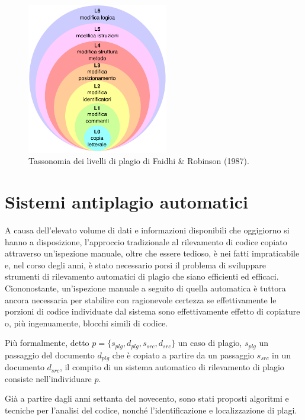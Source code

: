 \begin{figure}[h]
    \centering
    \includegraphics[width=0.55\textwidth]{resources/img/01-levels-of-plagiarism.pdf}
    \caption{Tassonomia dei livelli di plagio di Faidhi \& Robinson (1987).}
    \label{img:01-levels-of-plagiarism}
\end{figure}

\section{Sistemi antiplagio automatici}
A causa dell'elevato volume di dati e informazioni disponibili che oggigiorno si hanno a disposizione, l'approccio tradizionale al rilevamento di codice copiato attraverso un'ispezione manuale, oltre che essere tedioso, è nei fatti impraticabile e, nel corso degli anni, è stato necessario porsi il problema di sviluppare strumenti di rilevamento automatici di plagio che siano efficienti ed efficaci.
%
Ciononostante, un'ispezione manuale a seguito di quella automatica è tuttora ancora necessaria per stabilire con ragionevole certezza se effettivamente le porzioni di codice individuate dal sistema sono effettivamente effetto di copiature o, più ingenuamente, blocchi simili di codice.

Più formalmente, detto $p = \{s_{plg}, d_{plg}, s_{src}, d_{src}\}$ un caso di plagio, $s_{plg}$ un passaggio del documento $d_{plg}$ che è copiato a partire da un passaggio $s_{src}$ in un documento $d_{src}$, il compito di un sistema automatico di rilevamento di plagio consiste nell'individuare $p$.

Già a partire dagli anni settanta del novecento, sono stati proposti algoritmi e tecniche per l'analisi del codice, nonché l'identificazione e localizzazione di plagi.


